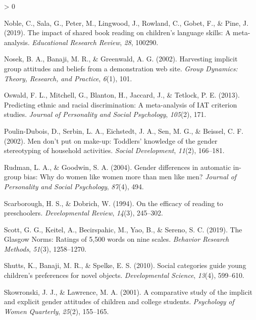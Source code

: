 \documentclass[
  english,
  ,man,floatsintext]{apa6}
\newlength{\cslhangindent}
\newenvironment{CSLReferences}[2] %
 {%
  \setlength{\parindent}{0pt}
  \ifodd #1 \everypar{\setlength{\hangindent}{\cslhangindent}}\ignorespaces\fi
  \ifnum #2 > 0
  \setlength{\parskip}{#2\baselineskip}
  \fi
 }%
 {}
\begin{document}
\begin{CSLReferences}{1}{0}
\leavevmode\hypertarget{ref-noble2019impact}{}%
Noble, C., Sala, G., Peter, M., Lingwood, J., Rowland, C., Gobet, F., \& Pine, J. (2019). The impact of shared book reading on children's language skills: A meta-analysis. \emph{Educational Research Review}, \emph{28}, 100290.

\leavevmode\hypertarget{ref-nosek2002harvesting}{}%
Nosek, B. A., Banaji, M. R., \& Greenwald, A. G. (2002). Harvesting implicit group attitudes and beliefs from a demonstration web site. \emph{Group Dynamics: Theory, Research, and Practice}, \emph{6}(1), 101.

\leavevmode\hypertarget{ref-oswald2013predicting}{}%
Oswald, F. L., Mitchell, G., Blanton, H., Jaccard, J., \& Tetlock, P. E. (2013). Predicting ethnic and racial discrimination: A meta-analysis of {IAT} criterion studies. \emph{Journal of Personality and Social Psychology}, \emph{105}(2), 171.

\leavevmode\hypertarget{ref-poulin2002men}{}%
Poulin-Dubois, D., Serbin, L. A., Eichstedt, J. A., Sen, M. G., \& Beissel, C. F. (2002). Men don't put on make-up: Toddlers' knowledge of the gender stereotyping of household activities. \emph{Social Development}, \emph{11}(2), 166--181.

\leavevmode\hypertarget{ref-rudman2004gender}{}%
Rudman, L. A., \& Goodwin, S. A. (2004). Gender differences in automatic in-group bias: Why do women like women more than men like men? \emph{Journal of Personality and Social Psychology}, \emph{87}(4), 494.

\leavevmode\hypertarget{ref-scarborough1994efficacy}{}%
Scarborough, H. S., \& Dobrich, W. (1994). On the efficacy of reading to preschoolers. \emph{Developmental Review}, \emph{14}(3), 245--302.

\leavevmode\hypertarget{ref-scott2019glasgow}{}%
Scott, G. G., Keitel, A., Becirspahic, M., Yao, B., \& Sereno, S. C. (2019). The {G}lasgow {N}orms: Ratings of 5,500 words on nine scales. \emph{Behavior Research Methods}, \emph{51}(3), 1258--1270.

\leavevmode\hypertarget{ref-shutts2010social}{}%
Shutts, K., Banaji, M. R., \& Spelke, E. S. (2010). Social categories guide young children's preferences for novel objects. \emph{Developmental Science}, \emph{13}(4), 599--610.

\leavevmode\hypertarget{ref-skowronski2001comparative}{}%
Skowronski, J. J., \& Lawrence, M. A. (2001). A comparative study of the implicit and explicit gender attitudes of children and college students. \emph{Psychology of Women Quarterly}, \emph{25}(2), 155--165.


\end{CSLReferences}
\end{document}
